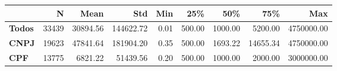 \begin{tabular}{lrrrrrrrr}
\toprule
{} &     N &     Mean &       Std &  Min &    25\% &     50\% &      75\% &        Max \\
\midrule
\textbf{Todos} & 33439 & 30894.56 & 144622.72 & 0.01 & 500.00 & 1000.00 &  5200.00 & 4750000.00 \\
\textbf{CNPJ } & 19623 & 47841.64 & 181904.20 & 0.35 & 500.00 & 1693.22 & 14655.34 & 4750000.00 \\
\textbf{CPF  } & 13775 &  6821.22 &  51439.56 & 0.20 & 500.00 & 1000.00 &  2000.00 & 3000000.00 \\
\bottomrule
\end{tabular}
